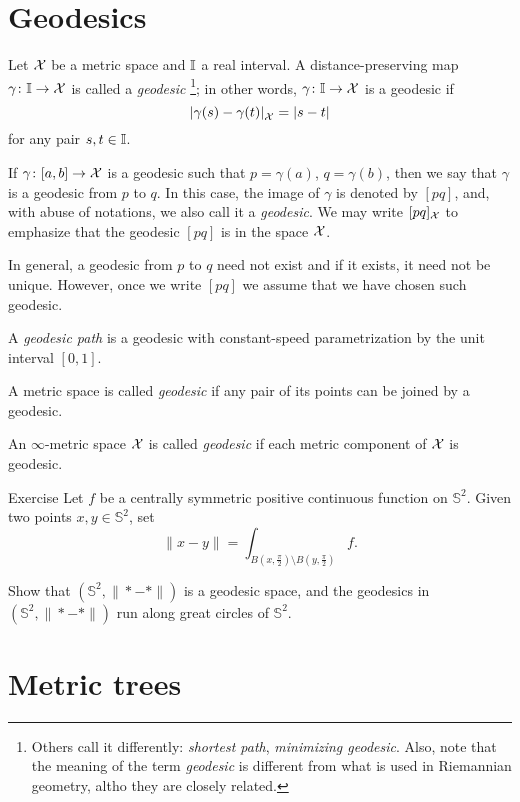 \section{Geodesics}
\label{sec:geods}

Let $\mathcal{X}$ be a metric space 
and $\II$\index{$\II$} a real interval. 
A distance-preserving map $\gamma\colon\mathbb{I}\to \mathcal{X}$ is called a \emph{geodesic}%
\footnote{Others call it differently: \textit{shortest path}, \textit{minimizing geodesic}.
Also, note that the meaning of the term \textit{geodesic} is different from what is used in Riemannian geometry, altho they are closely related.}; 
in other words, $\gamma\colon\mathbb{I}\to \mathcal{X}$ is a geodesic if 
\[\dist{\gamma(s)}{\gamma(t)}{\spc{X}}=|s-t|\]
for any pair $s,t\in \mathbb{I}$.

If $\gamma\colon[a,b]\to \mathcal{X}$ is a geodesic such that $p=\gamma(a)$, $q=\gamma(b)$, then we say that $\gamma$ is a geodesic from $p$ to $q$.
In this case, the image of $\gamma$ is denoted by $[p q]$\index{$[{*}{*}]$}, and, with abuse of notations, we also call it a \emph{geodesic}.
We may write $[p q]_{\mathcal{X}}$ 
to emphasize that the geodesic $[p q]$ is in the space  ${\mathcal{X}}$.

In general, a geodesic from $p$ to $q$ need not exist and if it exists, it need not  be unique.  
However, once we write $[p q]$ we assume that we have chosen such geodesic.

A \emph{geodesic path} is a geodesic with constant-speed parametrization by the unit interval $[0,1]$.

A metric space is called \emph{geodesic} if any pair of its points can be joined by a geodesic.

An $\infty$-metric space $\mathcal{X}$ is called {}\emph{geodesic} if each metric component of $\mathcal{X}$ is geodesic.

\begin{thm}{Exercise}\label{ex:pogorelov}
Let $f$ be a centrally symmetric positive continuous function on $\mathbb{S}^2$.
Given two points $x,y\in \mathbb{S}^2$,
set 
\[\|x-y\|=\int_{B(x,\frac \pi2)\setminus B(y,\frac\pi2)}f.\]

Show that $(\mathbb{S}^2,\|{*}-{*}\|)$ is a geodesic space,
and the geodesics in $(\mathbb{S}^2,\|{*}-{*}\|)$ run along great circles of $\mathbb{S}^2$.
\end{thm}

\section{Metric trees}

